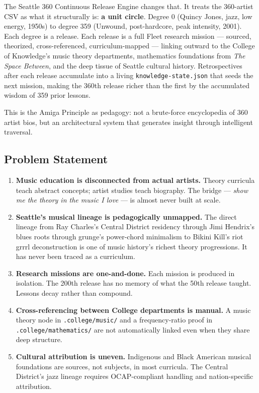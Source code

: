 \documentclass[11pt,letterpaper]{article}
\begin{document}
The Seattle 360 Continuous Release Engine changes that. It treats the 360-artist CSV as
what it structurally is: \textbf{a unit circle}. Degree 0 (Quincy Jones, jazz, low energy, 1950s)
to degree 359 (Unwound, post-hardcore, peak intensity, 2001). Each degree is a release.
Each release is a full Fleet research mission --- sourced, theorized, cross-referenced,
curriculum-mapped --- linking outward to the College of Knowledge's music theory
departments, mathematics foundations from \textit{The Space Between}, and the deep tissue of
Seattle cultural history. Retrospectives after each release accumulate into a living
\texttt{knowledge-state.json} that seeds the next mission, making the 360th release
richer than the first by the accumulated wisdom of 359 prior lessons.

This is the Amiga Principle as pedagogy: not a brute-force encyclopedia of 360 artist
bios, but an architectural system that generates insight through intelligent traversal.

\subsection{Problem Statement}

\begin{enumerate}[leftmargin=2em]
  \item \textbf{Music education is disconnected from actual artists.} Theory curricula teach
    abstract concepts; artist studies teach biography. The bridge --- \textit{show me the theory
    in the music I love} --- is almost never built at scale.

  \item \textbf{Seattle's musical lineage is pedagogically unmapped.} The direct lineage
    from Ray Charles's Central District residency through Jimi Hendrix's blues roots through
    grunge's power-chord minimalism to Bikini Kill's riot grrrl deconstruction is one of
    music history's richest theory progressions. It has never been traced as a curriculum.

  \item \textbf{Research missions are one-and-done.} Each mission is produced in isolation.
    The 200th release has no memory of what the 50th release taught. Lessons decay rather
    than compound.

  \item \textbf{Cross-referencing between College departments is manual.} A music theory node
    in \texttt{.college/music/} and a frequency-ratio proof in \texttt{.college/mathematics/}
    are not automatically linked even when they share deep structure.

  \item \textbf{Cultural attribution is uneven.} Indigenous and Black American musical
    foundations are sources, not subjects, in most curricula. The Central District's jazz
    lineage requires OCAP\textregistered{}-compliant handling and nation-specific attribution.
\end{enumerate}
\end{document}
